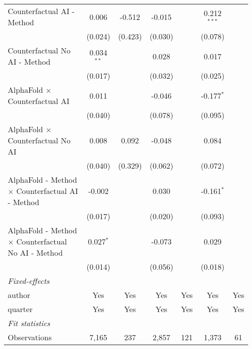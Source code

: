 \begin{tabular}{lcccccc}
   Counterfactual AI - Method                                 & 0.006        & -0.512  & -0.015  &         & 0.212$^{***}$  &   \\   
                                                              & (0.024)      & (0.423) & (0.030) &         & (0.078)        &   \\   
   Counterfactual No AI - Method                              & 0.034$^{**}$ &         & 0.028   &         & 0.017          &   \\   
                                                              & (0.017)      &         & (0.032) &         & (0.025)        &   \\   
   AlphaFold $\times$ Counterfactual AI                       & 0.011        &         & -0.046  &         & -0.177$^{*}$   &   \\   
                                                              & (0.040)      &         & (0.078) &         & (0.095)        &   \\   
   AlphaFold $\times$ Counterfactual No AI                    & 0.008        & 0.092   & -0.048  &         & 0.084          &   \\   
                                                              & (0.040)      & (0.329) & (0.062) &         & (0.072)        &   \\   
   AlphaFold - Method $\times$ Counterfactual AI - Method     & -0.002       &         & 0.030   &         & -0.161$^{*}$   &   \\   
                                                              & (0.017)      &         & (0.020) &         & (0.093)        &   \\   
   AlphaFold - Method $\times$ Counterfactual No AI - Method  & 0.027$^{*}$  &         & -0.073  &         & 0.029          &   \\   
                                                              & (0.014)      &         & (0.056) &         & (0.018)        &   \\   
   \midrule
   \emph{Fixed-effects}\\
   author                                                     & Yes          & Yes     & Yes     & Yes     & Yes            & Yes\\  
   quarter                                                    & Yes          & Yes     & Yes     & Yes     & Yes            & Yes\\  
   \midrule
   \emph{Fit statistics}\\
   Observations                                               & 7,165        & 237     & 2,857   & 121     & 1,373          & 61\\  

\end{tabular}
